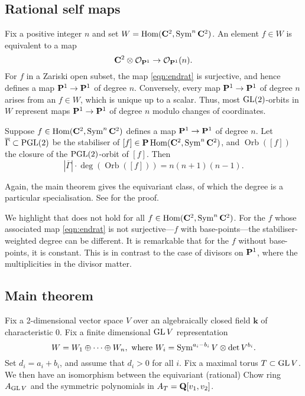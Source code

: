 \documentclass{amsart}
\renewcommand{\k}{\mathbf k}
\DeclareMathOperator{\Orb}{Orb}
\renewcommand{\O}{\mathcal O}
\begin{document}
\subsection{Rational self maps}\label{sec:introrationalmaps}
Fix a positive integer \(n\) and set \(W = \Hom(\C^2, \Sym^n\C^2)\).
An element \(f \in W\) is equivalent to a map
\begin{equation}\label{eqn:endrat}
  \C^{2} \otimes \O_{\P^1} \to \O_{\P^{1}}(n).
\end{equation}
For \(f\) in a Zariski open subset, the map \eqref{eqn:endrat} is surjective, and hence defines a map \(\P^{1}  \to \P^{1}\) of degree \(n\).
Conversely, every map \(\P^{1} \to \P^{1}\) of degree \(n\) arises from an \(f \in W\), which is unique up to a scalar.
Thus, most \(\GL(2)\)-orbits in \(W\) represent maps \(\P^1 \to \P^1\) of degree \(n\) modulo changes of coordinates.

\begin{theorem}\label{thm:ratmaps}
  Suppose \(f \in \Hom(\C^2, \Sym^n\C^2)\) defines a map \(\P^{1}\to \P^{1}\) of degree \(n\).
  Let \(\overline \Gamma \subset \PGL(2)\) be the stabiliser of \([f] \in \P \Hom(\C^2, \Sym^n\C^2)\), and \(\Orb([f])\) the closure of the \(\PGL(2)\)-orbit of \([f]\).
  Then
  \[ |\overline \Gamma| \cdot \deg(\Orb([f])) = n(n+1)(n-1).\]
\end{theorem}
Again, the main theorem gives the equivariant class, of which the degree is a particular specialisation.
See  for the proof.

We highlight that  does not hold for all \(f \in \Hom(\C^2, \Sym^n\C^2)\).
  For the \(f\) whose associated map \eqref{eqn:endrat} is not surjective---\(f\) with base-points---the stabiliser-weighted degree can be different.
  It is remarkable that for the \(f\) without base-points, it is constant.
  This is in contrast to the case of divisors on \(\P^1\), where the multiplicities in the divisor matter.

\subsection{Main theorem}\label{sec:intromain}
Fix a 2-dimensional vector space \(V\) over an algebraically closed  field \(\k\) of characteristic 0.
Fix a finite dimensional \(\GL V\) representation
\[ W = W_{1} \oplus \cdots \oplus W_{n}, \text{ where } W_i = \Sym^{a_i-b_i}V \otimes \det{V}^{b_i}.\]
Set \(d_i = a_i+b_i\), and assume that \(d_i > 0\) for all \(i\).
Fix a maximal torus \(T \subset \GL V\).
We then have an isomorphism between the equivariant (rational) Chow ring \(A_{\GL V}\) and the symmetric polynomials in \(A_T = \Q[v_1,v_2]\).
\end{document}

